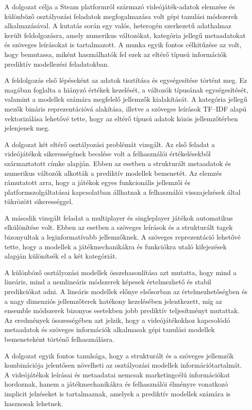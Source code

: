 
A dolgozat célja a Steam platformról származó videójáték-adatok
elemzése és különböző osztályozási feladatok megfogalmazása volt
gépi tanulási módszerek alkalmazásával.
A kutatás során egy valós, heterogén szerkezetű adathalmaz került
feldolgozásra, amely numerikus változókat,
kategória jellegű metaadatokat és szöveges leírásokat is tartalmazott.
A munka egyik fontos célkitűzése az volt,
hogy bemutassa, miként használhatók fel ezek az eltérő típusú információk
prediktív modellezési feladatokban.

A feldolgozás első lépéseként az adatok tisztítása és egységesítése történt meg.
Ez magában foglalta a hiányzó értékek kezelését,
a változók típusának egységesítését,
valamint a modellek számára megfelelő jellemzők kialakítását.
A kategória jellegű mezők bináris reprezentációvá alakítása,
illetve a szöveges leírások TF--IDF alapú vektorizálása
lehetővé tette, hogy az eltérő típusú adatok közös jellemzőtérben jelenjenek meg.

A dolgozat két eltérő osztályozási problémát vizsgált.
Az első feladat a videójátékok sikerességének becslése volt
a felhasználói értékelésekből származtatott címke alapján.
Ebben az esetben a strukturált metaadatok és numerikus változók
alkották a prediktív modellek bemenetét.
Az elemzés rámutatott arra, hogy a játékok egyes funkcionális
jellemzői és platformszolgáltatásai kapcsolatban állhatnak
a felhasználói visszajelzések által tükrözött sikerességgel.

A második vizsgált feladat a multiplayer és singleplayer
játékok automatikus elkülönítése volt.
Ebben az esetben a szöveges leírások és a strukturált tagek
bizonyultak a leginformatívabb jellemzőknek.
A szöveges reprezentáció lehetővé tette,
hogy a modellek a játékmechanikákra és funkciókra utaló
kifejezések alapján különítsék el a két kategóriát.

A különböző osztályozási modellek összehasonlítása azt mutatta,
hogy mind a lineáris, mind a nemlineáris módszerek
képesek értelmezhető és stabil predikciókat adni.
A lineáris modellek előnye elsősorban az értelmezhetőségben
és a nagy dimenziós jellemzőterek hatékony kezelésében jelentkezett,
míg az ensemble módszerek bizonyos esetekben
jobb prediktív teljesítményt mutattak.
Az eredmények összességében azt jelzik,
hogy a videójátékokhoz kapcsolódó metaadatok
és szöveges információk alkalmasak
gépi tanulási modellek bemeneteként történő felhasználásra.

A dolgozat egyik fontos tanulsága,
hogy a strukturált és a szöveges jellemzők kombinációja
jelentősen növelheti az osztályozási modellek információtartalmát.
A videójátékok leírásai és metaadatai nemcsak marketingcélú
információkat hordoznak,
hanem a játékmechanikákra és felhasználói élményre
vonatkozó implicit jelzéseket is tartalmaznak,
amelyek a prediktív modellek számára is hasznosak lehetnek.


